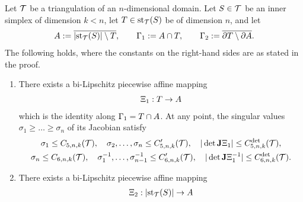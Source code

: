 \documentclass[10pt,a4paper]{article}
\begin{document}
\begin{proposition}\label{proposition:starreflection}
    Let ${\mathcal T}$ be a triangulation of an $n$-dimensional domain. 
    Let $S \in {\mathcal T}$ be an inner simplex of dimension $k < n$,
    let $T \in \operatorname{st}_{{\mathcal T}}(S)$ be of dimension $n$,
    and let 
    \begin{align*}
        A := \overline{ \left| \operatorname{st}_{{\mathcal T}}(S) \right| \setminus T },
        \qquad 
        {\Gamma_1} := A \cap T,
        \qquad 
        {\Gamma_2} := \overline{ \partial T \setminus \partial A }.
    \end{align*}
    The following holds, where the constants on the right-hand sides are as stated in the proof. 
    \begin{enumerate}
    \item 
    There exists a bi-Lipschitz piecewise affine mapping
    \begin{align*}
        \Xi_{1} : T \rightarrow A
    \end{align*}
    which is the identity along ${\Gamma_1} = T \cap A$. 
    At any point, the singular values $\sigma_1 \geq \dots \geq \sigma_n$ of its Jacobian satisfy 
    \begin{gather*}
        \sigma_1 \leq C_{5,n,k}({\mathcal T}),
        \quad 
        \sigma_2,\dots,\sigma_n \leq C'_{5,n,k}({\mathcal T}),
        \quad 
        | \det{\mathbf{J}}\Xi_{1} |      \leq C^{\det}_{5,n,k}({\mathcal T}),
        \\
        \sigma_n \leq C_{6,n,k}({\mathcal T}),
        \quad 
        \sigma_1^{-1},\dots,\sigma_{n-1}^{-1} \leq C'_{6,n,k}({\mathcal T}),
        \quad 
        | \det{\mathbf{J}}\Xi_{1}^{-1} | \leq C^{\det}_{6,n,k}({\mathcal T}).
    \end{gather*}
    \item 
    There exists a bi-Lipschitz piecewise affine mapping
    \begin{align*}
        \Xi_{2} : \left| \operatorname{st}_{{\mathcal T}}(S) \right| \rightarrow A
    \end{align*}

\end{enumerate}
\end{proposition}
\end{document}
